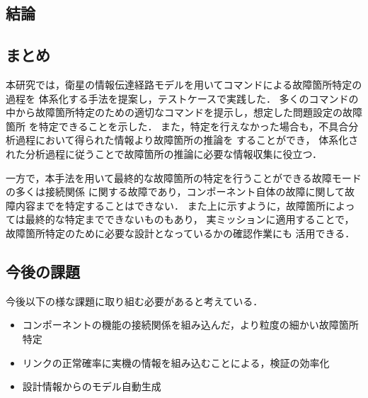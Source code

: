 \documentclass[11pt]{jsarticle}%
\begin{document}
\begin{multicols}{2}
\section{結論}
\vspace{-1zh}
\subsection{まとめ}
\vspace{-1zh} %
本研究では，衛星の情報伝達経路モデルを用いてコマンドによる故障箇所特定の過程を
体系化する手法を提案し，テストケースで実践した．
多くのコマンドの中から故障箇所特定のための適切なコマンドを提示し，想定した問題設定の故障箇所
を特定できることを示した．
また，特定を行えなかった場合も，不具合分析過程において得られた情報より故障箇所の推論を
することができ，
体系化された分析過程に従うことで故障箇所の推論に必要な情報収集に役立つ．

一方で，本手法を用いて最終的な故障箇所の特定を行うことができる故障モードの多くは接続関係
に関する故障であり，コンポーネント自体の故障に関して故障内容までを特定することはできない．
また上に示すように，故障箇所によっては最終的な特定までできないものもあり，
実ミッションに適用することで，故障箇所特定のために必要な設計となっているかの確認作業にも
活用できる．

\subsection{今後の課題}
今後以下の様な課題に取り組む必要があると考えている．
\begin{itemize}
  \item コンポーネントの機能の接続関係を組み込んだ，より粒度の細かい故障箇所特定
  \item リンクの正常確率に実機の情報を組み込むことによる，検証の効率化
  \item 設計情報からのモデル自動生成
\end{itemize}

\end{multicols}
\end{document}
